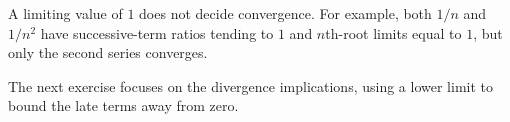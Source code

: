 A limiting value of $1$ does not decide convergence. For example,
both $1/n$ and $1/n^2$ have successive-term ratios tending to $1$
and $n$th-root limits equal to $1$, but only the second series converges.

The next exercise focuses on the divergence implications, using a lower
limit to bound the late terms away from zero.


